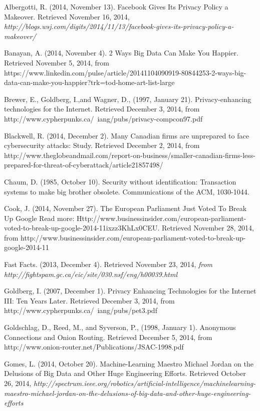 \documentclass[12pt]{article}
\begin{document}
\clearpage
\singlespace
\begin{thebibliography}{99}
	Albergotti, R. (2014, November 13). Facebook Gives Its Privacy Policy a Makeover. Retrieved November 16, 2014, {\sl http://blogs.wsj.com/digits/2014/11/13/facebook-gives-its-privacy-policy-a-makeover/}

	Banayan, A. (2014, November 4). 2 Ways Big Data Can Make You Happier. Retrieved November 5, 2014, from https://www.linkedin.com/pulse/article/20141104090919-80844253-2-ways-big-data-can-make-you-happier?trk=tod-home-art-list-large

	Brewer, E., Goldberg, I.,and  Wagner, D., (1997, January 21). Privacy-enhancing technologies for the Internet. Retrieved December 3, 2014, from http://www.cypherpunks.ca/~iang/pubs/privacy-compcon97.pdf

	Blackwell, R. (2014, December 2). Many Canadian firms are unprepared to face cybersecurity attacks: Study. Retrieved December 2, 2014, from http://www.theglobeandmail.com/report-on-business/smaller-canadian-firms-less-prepared-for-threat-of-cyberattack/article21857498/

	Chaum, D. (1985, October 10). Security without identification: Transaction systems to make big brother obsolete. Communications of the ACM, 1030-1044.

	Cook, J. (2014, November 27). The European Parliament Just Voted To Break Up Google Read more: Http://www.businessinsider.com/european-parliament-voted-to-break-up-google-2014-11ixzz3KhLx0CEU. Retrieved November 28, 2014, from http://www.businessinsider.com/european-parliament-voted-to-break-up-google-2014-11

	Fast Facts. (2013, December 4). Retrieved November 23, 2014, {\sl from http://fightspam.gc.ca/eic/site/030.nsf/eng/h\textunderscore00039.html}

	Goldberg, I. (2007, December 1). Privacy Enhancing Technologies for the Internet III: Ten Years Later. Retrieved December 3, 2014, from http://www.cypherpunks.ca/~iang/pubs/pet3.pdf

	Goldschlag, D., Reed, M., and Syverson, P., (1998, January 1). Anonymous Connections and Onion Routing. Retrieved December 5, 2014, from http://www.onion-router.net/Publications/JSAC-1998.pdf

	Gomes, L. (2014, October 20). Machine-Learning Maestro Michael Jordan on the Delusions of Big Data and Other Huge Engineering Efforts. Retrieved October 26, 2014, {\sl http://spectrum.ieee.org/robotics/artificial-intelligence/machinelearning-maestro-michael-jordan-on-the-delusions-of-big-data-and-other-huge-engineering-efforts}


\end{thebibliography}
\end{document}
